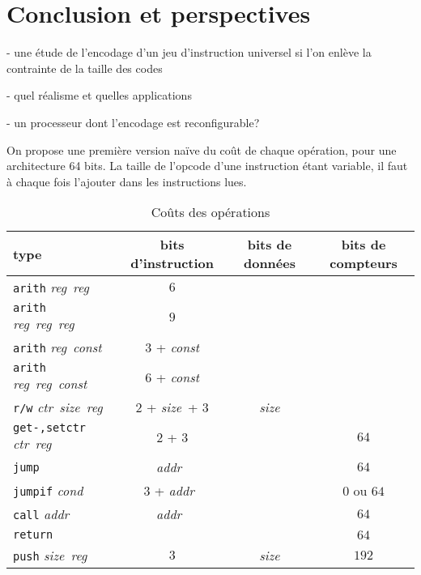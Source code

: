 \documentclass[architecture]{compas2018}
\newcommand{\reg}{\textit{reg}}
\newcommand{\const}{\textit{const}}
\newcommand{\cond}{\textit{cond}}
\newcommand{\ctr}{\textit{ctr}}
\newcommand{\size}{\textit{size}}
\newcommand{\addr}{\textit{addr}}
\begin{document}
\section{Conclusion et perspectives}

- une étude de l'encodage d'un jeu d'instruction universel si l'on enlève la contrainte de la taille des codes

- quel réalisme et quelles applications

- un processeur dont l'encodage est reconfigurable? 



\begin{table}[!h]
  \caption{Coûts des opérations}
  \label{tab:costs}
  On propose une première version naïve du coût de chaque opération, pour une architecture 64 bits. La taille de l'opcode d'une instruction étant variable, il faut à chaque fois l'ajouter dans les instructions lues.
  \begin{center}
  \begin{tabular}{|l|c|c|c|}
    \hline  
    type & bits d'instruction & bits de données & bits de compteurs \\
    \hline  
    \hline
    \texttt{arith} \reg\ \reg\ & $6$                &    &      \\
    \hline
    \texttt{arith} \reg\ \reg\ \reg\   & $9$   &    &      \\
    \hline
    \texttt{arith} \reg\ \const\       & $3$ + \const       &    &      \\
    \hline
    \texttt{arith} \reg\ \reg\ \const\ & $6$ + \const       &    &      \\
    \hline
    \texttt{r/w} \ctr\ \size\ \reg     & $2$ + \size\ + $3$ & \size           &      \\
    \hline
    \texttt{get-,setctr} \ctr\ \reg\   & $2$ + $3$          &    & $64$              \\
    \hline
    \texttt{jump}         & \addr\             &    & $64$              \\
    \hline
    \texttt{jumpif} \cond & $3$ + \addr\       &    & $0$ ou $64$       \\
    \hline
    \texttt{call} \addr   & \addr\             &    & $64$              \\
    \hline
    \texttt{return}       &       &    & $64$              \\
    \hline
    \texttt{push} \size\ \reg          & $3$   & \size           & $192$             \\
    \hline
  \end{tabular}

\end{center}
\end{table}
\end{document}
